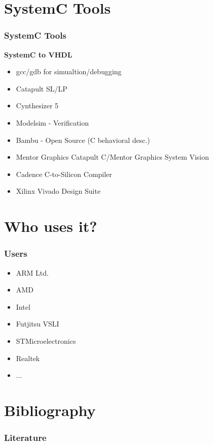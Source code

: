 \documentclass{beamer}
\begin{document}
\section{SystemC Tools}
\begin{frame}\frametitle{SystemC Tools} 
\textbf{SystemC to VHDL}
    \begin{itemize}
      \item{gcc/gdb for simualtion/debugging}
      \item{Catapult SL/LP}
      \item{Cynthesizer 5 }
      \item{Modelsim - Verification}
      \item{Bambu - Open Source (C behavioral desc.)}
      \item{Mentor Graphics Catapult C/Mentor Graphics System Vision}
      \item{Cadence C-to-Silicon Compiler}
      \item{Xilinx Vivado Design Suite}
    \end{itemize}
\end{frame}

\section{Who uses it?}
\begin{frame}\frametitle{Users} 
    \begin{itemize}
      \item{ARM Ltd.}
      \item{AMD}
      \item{Intel}
      \item{Futjitsu VSLI}
      \item{STMicroelectronics}
      \item{Realtek}
      \item{...}
    \end{itemize}
\end{frame}
      
\section{Bibliography}
\nocite{haubelt2010digitale}
\begin{frame}\frametitle{Literature} 


\end{frame}
\end{document}

